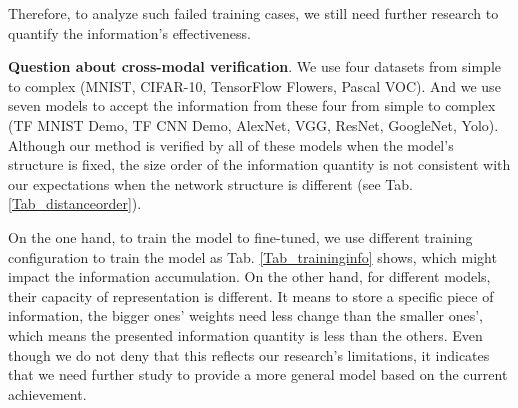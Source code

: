 \documentclass[letterpaper]{article} %
\begin{document}
Therefore, to analyze such failed training cases, we still need further research to quantify the information's effectiveness.

\textbf{Question about cross-modal verification}. We use four datasets from simple to complex (MNIST, CIFAR-10, TensorFlow Flowers, Pascal VOC). And we use seven models to accept the information from these four from simple to complex (TF MNIST Demo, TF CNN Demo, AlexNet, VGG, ResNet, GoogleNet, Yolo). Although our method is verified by all of these models when the model's structure is fixed, the size order of the information quantity is not consistent with our expectations when the network structure is different (see Tab. \ref{Tab_distanceorder}).

On the one hand, to train the model to fine-tuned, we use different training configuration to train the model as Tab. \ref{Tab_traininginfo} shows, which might impact the information accumulation. On the other hand, for different models, their capacity of representation is different. It means to store a specific piece of information, the bigger ones' weights need less change than the smaller ones', which means the presented information quantity is less than the others.
Even though we do not deny that this reflects our research's limitations, it indicates that we need further study to provide a more general model based on the current achievement.
\end{document}
